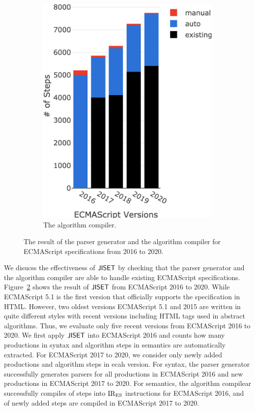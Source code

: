 \begin{figure}[t]
\begin{subfigure}{0.23\textwidth}
    \includegraphics[width=\textwidth]{img/all-version-sem.png}
    \caption{The algorithm compiler.}
    \label{fig:semantics-all-version}
  \end{subfigure}
  \caption{The result of the parser generator and the algorithm compiler for
  ECMAScript specifications from 2016 to 2020.}
  \label{fig:all-version}
\end{figure}

We disucss the effectiveness of \( \text{\sf JISET} \) by checking that the parser generator
and the algorithm compiler are able to handle existing ECMAScript specifications.
Figure~\ref{fig:all-version} shows the result of \( \text{\sf JISET} \) from ECMAScript 2016
to 2020. While ECMAScript 5.1 is the first version that officially supports
the specification in HTML. However, two oldest versions ECMAScript 5.1 and 2015 are written
in quite different styles with recent versions including HTML tags used in abstract algorithms.
Thus, we evaluate only five recent versions from ECMAScript 2016 to 2020.
We first apply \( \text{\sf JISET} \) into ECMAScript 2016 and counts how many productions in syntax
and algorithm steps in semantics are automatically extracted. For ECMAScript 2017 to 2020,
we consider only newly added productions and algorithm steps in ecah version.
For syntax, the parser generator successfully generates parsers for all  productions
in ECMAScript 2016 and  new productions in ECMAScript 2017 to 2020.
For semantics, the algorithm compilear successfully compiles  of  steps
into \( \text{IR}_\text{ES} \) instructions for ECMAScript 2016, and  of  newly added
steps are compiled in ECMAScript 2017 to 2020.

